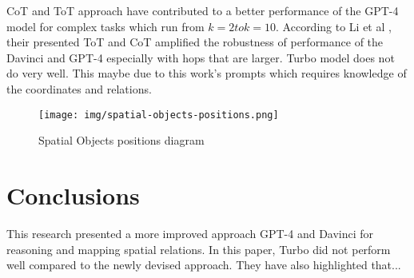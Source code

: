 \documentclass{article}
\begin{document}
CoT and ToT approach have contributed to a better performance of the GPT-4 model for complex tasks which run from $k = 2 to k = 10$. According to Li et al \cite{li2024}, their presented ToT and CoT amplified the robustness of performance of the Davinci and GPT-4 especially with hops that are larger. Turbo model does not do very well. This maybe due to this work's prompts which requires knowledge of the coordinates and relations.


\begin{figure}[!ht]
    \centering
    \texttt{[image: img/spatial-objects-positions.png]}
    \caption{Spatial Objects positions diagram}
    \label{fig:Spatial Objects positions}
\end{figure}
\section{Conclusions}

This research presented a more improved approach GPT-4 and Davinci for reasoning and mapping spatial relations. In this paper, Turbo did not perform well compared to the newly devised approach. They have also highlighted that...


\newpage


\end{document}
